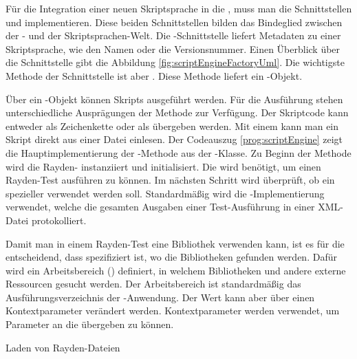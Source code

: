 \SuperPar
Für die Integration einer neuen Skriptsprache in die , muss man die Schnittstellen  und  implementieren. Diese beiden Schnittstellen bilden das Bindeglied zwischen der - und der Skriptsprachen-Welt. Die -Schnittstelle liefert Metadaten zu einer Skriptsprache, wie den Namen oder die Versionsnummer. Einen Überblick über die Schnittstelle gibt die Abbildung \ref{fig:scriptEngineFactoryUml}. Die wichtigste Methode der Schnittstelle ist aber . Diese Methode liefert ein -Objekt.

\SuperPar
Über ein -Objekt können Skripts ausgeführt werden. Für die Ausführung stehen unterschiedliche Ausprägungen der Methode  zur Verfügung. Der Skriptcode kann entweder als Zeichenkette oder als  übergeben werden. Mit einem  kann man ein Skript direkt aus einer Datei einlesen. Der Codeauszug \ref{prog:scriptEngine} zeigt die Hauptimplementierung der -Methode aus der -Klasse. Zu Beginn der Methode wird die Rayden- instanziiert und initialisiert. Die  wird benötigt, um einen Rayden-Test ausführen zu können. Im nächsten Schritt wird überprüft, ob ein spezieller  verwendet werden soll. Standardmäßig wird die -Implementierung verwendet, welche die gesamten Ausgaben einer Test-Ausführung in einer XML-Datei protokolliert. 

\SuperPar
Damit man in einem Rayden-Test eine Bibliothek verwenden kann, ist es für die  entscheidend, dass spezifiziert ist, wo die Bibliotheken gefunden werden. Dafür wird ein Arbeitsbereich () definiert, in welchem Bibliotheken und andere externe Ressourcen gesucht werden. Der Arbeitsbereich ist standardmäßig das Ausführungsverzeichnis der -Anwendung. Der Wert kann aber über einen Kontextparameter verändert werden. Kontextparameter werden verwendet, um Parameter an die  übergeben zu können. 

\begin{program}

\caption{Laden von Rayden-Dateien}
\label{prog:loadFile}
\end{program}


